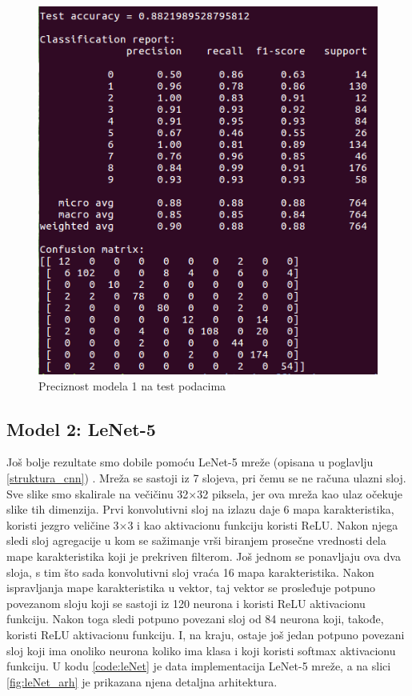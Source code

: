 \documentclass[a4paper]{article}
\begin{document}
\begin{figure}[h!]
\begin{center}
\includegraphics[scale=0.40]{model1_test_acc.png}
\end{center}
\caption{Preciznost modela 1 na test podacima}
\label{fig:model1_test_acc}
\end{figure}



\newpage

\subsection{Model 2:  LeNet-5}
\label{sec:model_2}


Još bolje rezultate smo dobile pomoću LeNet-5 mreže (opisana u poglavlju \ref{struktura_cnn}) \cite{leNet}. Mreža se sastoji iz 7 slojeva, pri čemu se ne računa ulazni sloj. Sve slike smo skalirale na večičinu 32$\times$32 piksela, jer ova mreža kao ulaz očekuje slike tih dimenzija. Prvi konvolutivni sloj na izlazu daje 6 mapa karakteristika, koristi jezgro veličine 3$\times$3 i kao aktivacionu funkciju koristi ReLU. Nakon njega sledi sloj agregacije u kom se sažimanje vrši biranjem prosečne vrednosti dela mape karakteristika koji je prekriven filterom. 
Još jednom se ponavljaju ova dva sloja, s tim što sada konvolutivni sloj vraća 16 mapa karakteristika. Nakon ispravljanja mape karakteristika u vektor, taj vektor se prosleđuje potpuno povezanom sloju koji se sastoji iz 120 neurona i koristi ReLU aktivacionu funkciju. Nakon toga sledi potpuno povezani sloj od 84 neurona koji, takođe, koristi ReLU aktivacionu funkciju. I, na kraju, ostaje još jedan potpuno povezani sloj koji ima onoliko neurona koliko ima klasa i koji koristi softmax aktivacionu funkciju. U kodu \ref{code:leNet} je data implementacija LeNet-5 mreže, a na slici \ref{fig:leNet_arh} je prikazana njena detaljna arhitektura.
\end{document}
